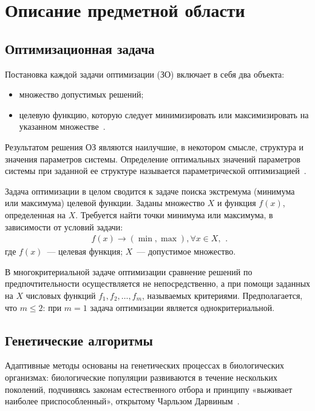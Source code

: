 \chapter{Описание предметной области}

\section{Оптимизационная задача}

Постановка каждой задачи оптимизации (ЗО) включает в себя два объекта: 
\begin{itemize}
	\item множество допустимых решений;
	\item целевую функцию, которую следует минимизировать или максимизировать на указанном множестве~\cite{metodoptimization}.
\end{itemize}

Результатом решения ОЗ являются наилучшие, в некотором смысле, структура и значения параметров системы. 
Определение оптимальных значений параметров системы при заданной ее структуре называется параметрической оптимизацией~\cite{paramoptimization}.

Задача оптимизации в целом сводится к задаче поиска экстремума (минимума или максимума) целевой функции. 
Заданы множество $X$ и функция $f(x)$, определенная на $X$. Требуется найти точки минимума или максимума, в зависимости от условий задачи:
\begin{equation}
	\begin{gathered}
		f(x) \to (\min, \max), \forall x \in X,
	\end{gathered}.
\end{equation}
где $f(x)$~--- целевая функция;
$X$~--- допустимое множество.

В многокритериальной задаче оптимизации сравнение решений по предпочтительности осуществляется не непосредственно, а при помощи заданных на $X$ числовых функций $f_1, f_2, \dots ,f_m$, называемых критериями. 
Предполагается, что $m \leq 2$: при $m = 1$ задача оптимизации является однокритериальной.

\clearpage
\section{Генетические алгоритмы}
Адаптивные методы основаны на генетических процессах в биологических организмах: биологические популяции развиваются в течение нескольких поколений, подчиняясь законам естественного отбора и принципу «выживает наиболее приспособленный», открытому Чарльзом Дарвиным~\cite{GA}.

